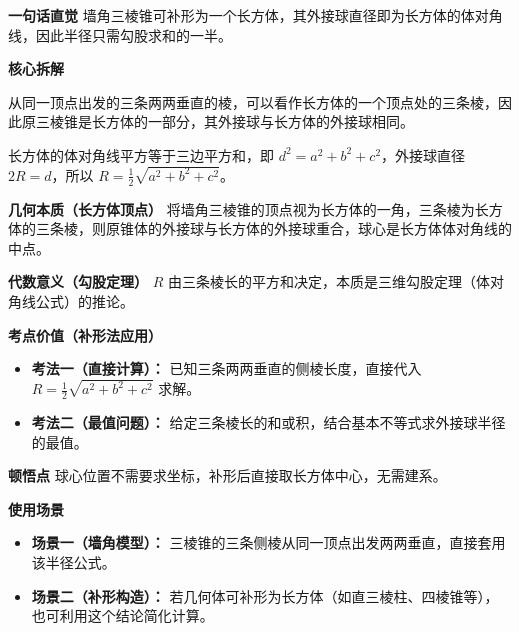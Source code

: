 \begin{explanationbox}
	\textbf{\textcolor{CExplanation}{一句话直觉}}
	墙角三棱锥可补形为一个长方体，其外接球直径即为长方体的体对角线，因此半径只需勾股求和的一半。

	\medskip
	\textbf{\textcolor{CExplanation}{核心拆解}}
	\begin{description}[style=nextline, leftmargin=2.8em, labelsep=0.5em, itemsep=0.45em]
		\item[\textbf{要点一（补形转换）：}]
			从同一顶点出发的三条两两垂直的棱，可以看作长方体的一个顶点处的三条棱，因此原三棱锥是长方体的一部分，其外接球与长方体的外接球相同。
		\item[\textbf{要点二（勾股求和）：}]
			长方体的体对角线平方等于三边平方和，即 $d^2 = a^2+b^2+c^2$，外接球直径 $2R = d$，所以 $R = \frac12\sqrt{a^2+b^2+c^2}$。
	\end{description}

	\medskip
	\textbf{\textcolor{CExplanation}{几何本质（长方体顶点）}}
	将墙角三棱锥的顶点视为长方体的一角，三条棱为长方体的三条棱，则原锥体的外接球与长方体的外接球重合，球心是长方体体对角线的中点。

	\medskip
	\textbf{\textcolor{CExplanation}{代数意义（勾股定理）}}
	$R$ 由三条棱长的平方和决定，本质是三维勾股定理（体对角线公式）的推论。

	\medskip
	\textbf{\textcolor{CExplanation}{考点价值（补形法应用）}}
	\begin{itemize}[leftmargin=*, itemsep=0.5em, topsep=0.4em]
		\item \textbf{考法一（直接计算）：} 已知三条两两垂直的侧棱长度，直接代入 $R = \frac12\sqrt{a^2+b^2+c^2}$ 求解。
		\item \textbf{考法二（最值问题）：} 给定三条棱长的和或积，结合基本不等式求外接球半径的最值。
	\end{itemize}

	\medskip
	\textbf{\textcolor{CExplanation}{顿悟点}}
	球心位置不需要求坐标，补形后直接取长方体中心，无需建系。

	\medskip
	\textbf{\textcolor{CExplanation}{使用场景}}
	\begin{itemize}[leftmargin=*, itemsep=0.5em, topsep=0.4em]
		\item \textbf{场景一（墙角模型）：} 三棱锥的三条侧棱从同一顶点出发两两垂直，直接套用该半径公式。
		\item \textbf{场景二（补形构造）：} 若几何体可补形为长方体（如直三棱柱、四棱锥等），也可利用这个结论简化计算。
	\end{itemize}

\end{explanationbox}
